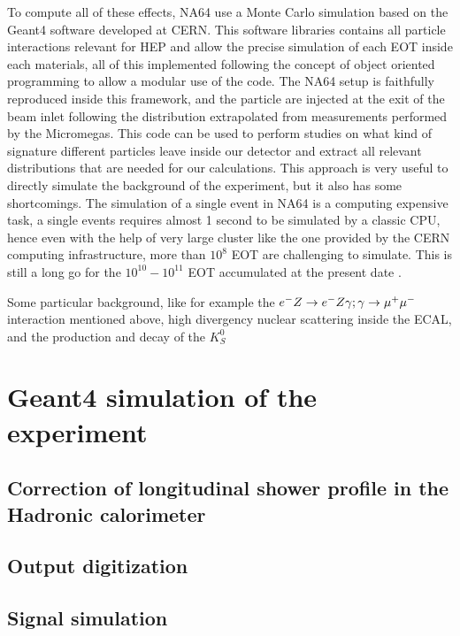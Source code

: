 To compute all of these effects, NA64 use a Monte Carlo simulation based on the Geant4 software \cite{AGOSTINELLI2003250,1610988} developed at CERN. This software libraries contains all particle interactions relevant for HEP and allow the precise simulation of each EOT inside each materials, all of this implemented following the concept of object oriented programming to allow a modular use of the code. The NA64 setup is faithfully reproduced inside this framework, and the particle are injected at the exit of the beam inlet following the distribution extrapolated from measurements performed by the Micromegas. This code can be used to perform studies on what kind of signature different particles leave inside our detector and extract all relevant distributions that are needed for our calculations. This approach is very useful to directly simulate the background of the experiment, but it also has some shortcomings. The simulation of a single event in NA64 is a computing expensive task, a single events requires almost 1 second to be simulated by a classic CPU, hence even with the help of very large cluster like the one provided by the CERN computing infrastructure, more than $10^8$ EOT are challenging to simulate. This is still a long go for the $10^{10}-10^{11}$ EOT accumulated at the present date \cite{Banerjee:2019hmi,NA64:2019imj}.

Some particular background, like for example the $e^- Z \to e^- Z \gamma; \gamma \to \mu^+ \mu^-$ interaction mentioned above, high divergency nuclear scattering inside the ECAL, and the production and decay of the $K^0_S$

\section{Geant4 simulation of the experiment}
\label{ch3:sec:geant4}

\subsection{Correction of longitudinal shower profile in the Hadronic calorimeter}
\label{ch3:sec:geant4-hcal-corr}

\subsection{Output digitization}
\label{ch3:sec:geant4-digitization}

\subsection{Signal simulation}
\label{ch3:sec:geant4-signal}

